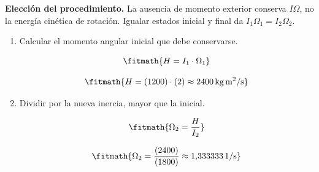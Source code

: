 \noindent\textbf{Elección del procedimiento.} La ausencia de momento exterior conserva $I\Omega$, no la energía cinética de rotación. Igualar estados inicial y final da $I_1\Omega_1=I_2\Omega_2$.

\begin{enumerate}

\item Calcular el momento angular inicial que debe conservarse.

\[\fitmath{H=I_{1}\cdot \Omega_{1}}\]

\[\fitmath{H=(1200)\cdot (2)\approx 2400\,\mathrm{kg\,m^{2}/s}}\]

\item Dividir por la nueva inercia, mayor que la inicial.

\[\fitmath{\Omega_{2}=\frac{H}{I_{2}}}\]

\[\fitmath{\Omega_{2}=\frac{(2400)}{(1800)}\approx 1{,}333333\,\mathrm{1/s}}\]

\end{enumerate}
